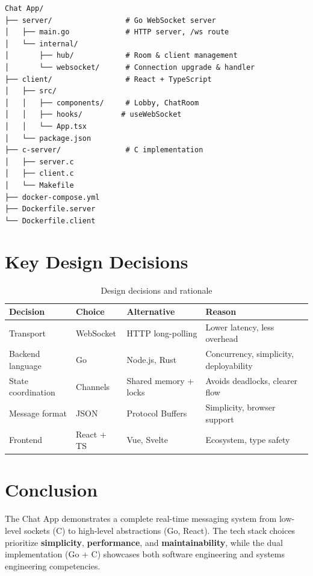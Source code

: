 \documentclass[11pt,a4paper]{article}
\begin{document}
\begin{verbatim}
Chat App/
├── server/                 # Go WebSocket server
│   ├── main.go             # HTTP server, /ws route
│   └── internal/
│       ├── hub/            # Room & client management
│       └── websocket/      # Connection upgrade & handler
├── client/                 # React + TypeScript
│   ├── src/
│   │   ├── components/     # Lobby, ChatRoom
│   │   ├── hooks/         # useWebSocket
│   │   └── App.tsx
│   └── package.json
├── c-server/               # C implementation
│   ├── server.c
│   ├── client.c
│   └── Makefile
├── docker-compose.yml
├── Dockerfile.server
└── Dockerfile.client
\end{verbatim}

\section{Key Design Decisions}

\begin{table}[h]
\centering
\begin{tabular}{llll}
\toprule
\textbf{Decision} & \textbf{Choice} & \textbf{Alternative} & \textbf{Reason} \\
\midrule
Transport & WebSocket & HTTP long-polling & Lower latency, less overhead \\
Backend language & Go & Node.js, Rust & Concurrency, simplicity, deployability \\
State coordination & Channels & Shared memory + locks & Avoids deadlocks, clearer flow \\
Message format & JSON & Protocol Buffers & Simplicity, browser support \\
Frontend & React + TS & Vue, Svelte & Ecosystem, type safety \\
\bottomrule
\end{tabular}
\caption{Design decisions and rationale}
\end{table}

\section{Conclusion}

The Chat App demonstrates a complete real-time messaging system from low-level sockets (C) to high-level abstractions (Go, React). The tech stack choices prioritize \textbf{simplicity}, \textbf{performance}, and \textbf{maintainability}, while the dual implementation (Go + C) showcases both software engineering and systems engineering competencies.
\end{document}
